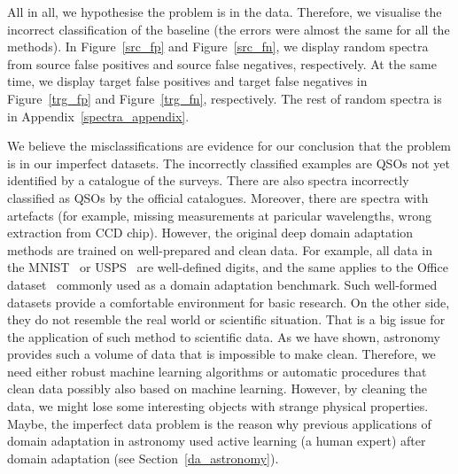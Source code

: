 All in all, we hypothesise the problem is in the data.
Therefore, we visualise the incorrect classification of the baseline
(the errors were almost the same for all the methods).
In Figure~\ref{src_fp} and Figure~\ref{src_fn},
we display random spectra from source false positives and source false negatives, respectively.
At the same time, we display target false positives and target false negatives in Figure~\ref{trg_fp} and Figure~\ref{trg_fn}, respectively.
The rest of random spectra is in Appendix~\ref{spectra_appendix}.

We believe the misclassifications are evidence for our conclusion
that the problem is in our imperfect datasets.
The incorrectly classified examples are QSOs not yet identified by a catalogue of the surveys.
There are also spectra incorrectly classified as QSOs by the official catalogues.
Moreover, there are spectra with artefacts
(for example, missing measurements at paricular wavelengths, wrong extraction from CCD chip). 
However, the original deep domain adaptation methods are trained on well-prepared and clean data.
For example, all data in the MNIST~\cite{lecun1998} or USPS~\cite{hull1994} are well-defined digits,
and the same applies to the Office dataset~\cite{saenko2010} commonly used as a domain adaptation benchmark.
Such well-formed datasets provide a comfortable environment for basic research.
On the other side, they do not resemble the real world or scientific situation.
That is a big issue for the application of such method to scientific data.
As we have shown, astronomy provides such a volume of data that is impossible to make clean.
Therefore, we need either robust machine learning algorithms
or automatic procedures that clean data possibly also based on machine learning.
However, by cleaning the data, we might lose some interesting objects with strange physical properties.
Maybe, the imperfect data problem is the reason
why previous applications of domain adaptation in astronomy used active learning (a human expert)
after domain adaptation (see Section~\ref{da_astronomy}).

